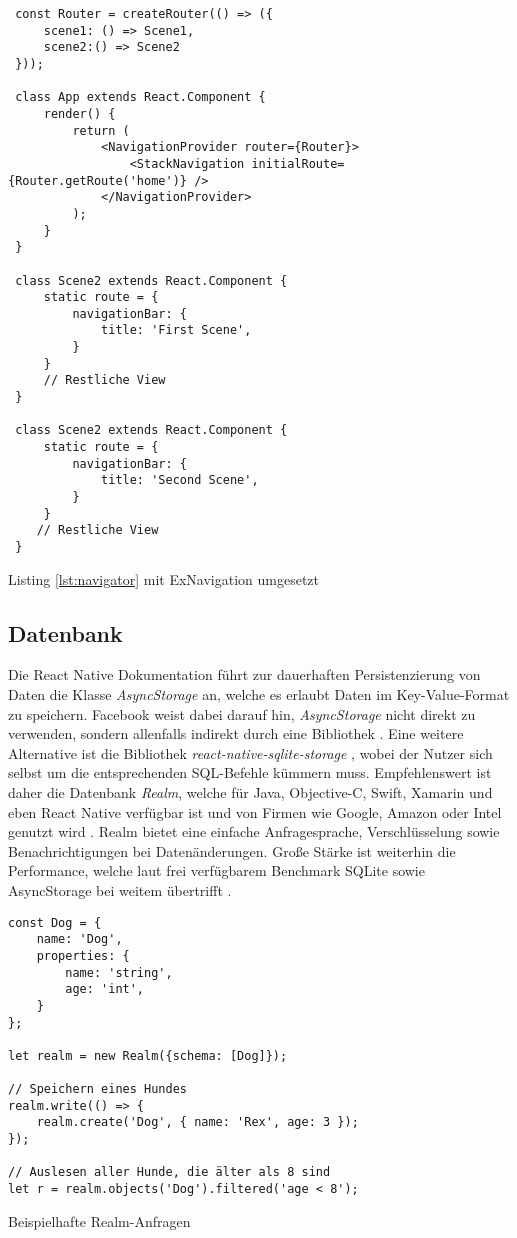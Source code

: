 \begin{listing}[H]
    \begin{verbatim}
 const Router = createRouter(() => ({
     scene1: () => Scene1,
     scene2:() => Scene2
 }));
 
 class App extends React.Component {
     render() {
         return (
             <NavigationProvider router={Router}>
                 <StackNavigation initialRoute={Router.getRoute('home')} />
             </NavigationProvider>
         );
     }
 }
 
 class Scene2 extends React.Component {
     static route = {
         navigationBar: {
             title: 'First Scene',
         }
     }
     // Restliche View
 }
 
 class Scene2 extends React.Component {
     static route = {
         navigationBar: {
             title: 'Second Scene',
         }
     }
    // Restliche View
 }
    \end{verbatim}
    \caption{Listing \ref{lst:navigator} mit ExNavigation umgesetzt}
    \label{lst:ex_navigation}
\end{listing}

\subsection{Datenbank}
Die React Native Dokumentation führt zur dauerhaften Persistenzierung von Daten die Klasse \textit{AsyncStorage} an, welche es erlaubt Daten im Key-Value-Format zu speichern. Facebook weist dabei darauf hin, \textit{AsyncStorage} nicht direkt zu verwenden, sondern allenfalls indirekt durch eine Bibliothek \cite{AsyncStorage_2017}. Eine weitere Alternative ist die Bibliothek \textit{react-native-sqlite-storage} \cite{react-native-sqlite-storage_2016}, wobei der Nutzer sich selbst um die entsprechenden SQL-Befehle kümmern muss. Empfehlenswert ist daher die Datenbank \textit{Realm}, welche für Java, Objective-C, Swift, Xamarin und eben React Native verfügbar ist und von Firmen wie Google, Amazon oder Intel genutzt wird \cite{Realm_2016}. Realm bietet eine einfache Anfragesprache, Verschlüsselung sowie Benachrichtigungen bei Datenänderungen. Große Stärke ist weiterhin die Performance, welche laut frei verfügbarem Benchmark SQLite sowie AsyncStorage bei weitem übertrifft \cite{Introducing_Realm_React_Native_2016}. 

\begin{listing}[H]
    \begin{verbatim}
const Dog = {
    name: 'Dog',
    properties: {
        name: 'string',
        age: 'int',
    }
};

let realm = new Realm({schema: [Dog]});

// Speichern eines Hundes
realm.write(() => {
    realm.create('Dog', { name: 'Rex', age: 3 });
});

// Auslesen aller Hunde, die älter als 8 sind
let r = realm.objects('Dog').filtered('age < 8');
    \end{verbatim}
    \caption{Beispielhafte Realm-Anfragen}
    \label{lst:realm}
\end{listing}

